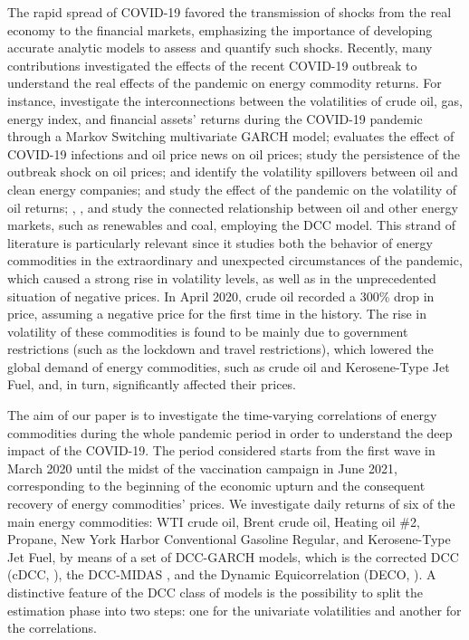 The rapid spread of COVID-19 favored the transmission of shocks from the real economy to the financial markets, emphasizing the importance of developing accurate analytic models to assess and quantify such shocks. Recently, many contributions %
investigated the effects of the recent COVID-19 outbreak to understand the real effects of the pandemic on energy commodity returns. For instance, {\cite{Ghorbel:Jeribi:2021} investigate the interconnections between the volatilities of crude oil, gas, energy index, and financial assets' returns during the COVID-19 pandemic through a Markov Switching multivariate GARCH model;} \cite{narayan2020oil} evaluates the effect of COVID-19 infections and oil price news on oil prices; \cite{gil2020crude} study the persistence of the outbreak shock on oil prices; \cite{iyke2020covid} and
{\cite{Foglia:Angelini:2020} identify the volatility spillovers between oil and clean energy companies}; \cite{gil2020crude} and \cite{bouazizi2021oil} study the effect of the pandemic on the volatility of oil returns; \cite{corbet2020co}, \cite{lin2021does}, and \cite{de2021price} study the connected relationship between oil and other energy markets, such as renewables and coal, employing the DCC model.
This strand of literature is particularly relevant since it studies both the behavior of energy commodities in the extraordinary and unexpected circumstances of the pandemic, which caused a strong rise in volatility levels, as well as in the unprecedented situation of negative prices. In April 2020, crude oil recorded a 300\% drop in price, assuming a negative price for the first time in the history. The rise in volatility of these commodities is found to be mainly due to government restrictions (such as the lockdown and travel restrictions), which lowered the global demand of energy commodities, such as crude oil and Kerosene-Type Jet Fuel, and, in turn, significantly affected their prices.

The aim of our paper is to investigate the time-varying  correlations of energy commodities during the whole pandemic period in order to understand the deep impact of the COVID-19. The period considered starts from the first wave in March 2020 until the midst of the vaccination campaign in June 2021, corresponding to the beginning of the economic upturn and the consequent recovery of energy commodities' prices. We investigate daily returns of {six of the main} energy commodities: WTI crude oil, Brent crude oil, Heating oil \#2, Propane, New York Harbor Conventional Gasoline Regular, and Kerosene-Type Jet Fuel, by means of a set of DCC-GARCH models, which is the corrected DCC (cDCC, \citealp{Aielli:2013}), the DCC-MIDAS \citep{Colacito:Engle:Ghysels:2011}, and the Dynamic Equicorrelation (DECO, \citealp{Engle2012c}). {A distinctive feature of the DCC class of models is the possibility to split the estimation phase into two steps: one for the univariate volatilities and another for the correlations.}

